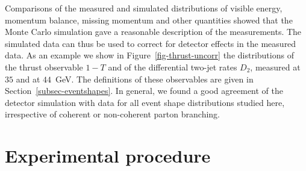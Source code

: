 \documentclass[12pt,a4paper,twoside]{article}
\begin{document}
Comparisons of the measured and simulated distributions of visible 
energy, momentum balance, missing momentum and other quantities showed 
that the Monte 
Carlo simulation gave a reasonable description of the measurements. 
The simulated data can thus be used to correct for 
detector effects in the measured data.
As an example we show in Figure~\ref{fig-thrust-uncorr} 
the distributions of the thrust observable $1-T$ and of the 
differential two-jet rates $D_2$, measured at $35$ and at
$44$~GeV. The definitions of these observables are given in
Section~\ref{subsec-eventshapes}.
In general, we found a good agreement of the detector
simulation with data for all event shape distributions studied here,
irrespective of coherent or non-coherent parton branching.

\section{Experimental procedure}
\label{sec-procedure}
\end{document}
